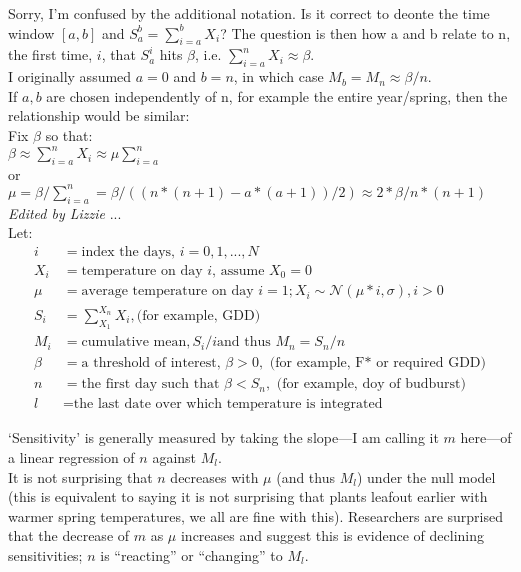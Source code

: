 \documentclass[11pt,letter]{article}
\begin{document}
Sorry, I'm confused by the additional notation. Is it correct to deonte the time window $[a, b]$ and $S_a^b = \sum_{i = a}^b X_i $?
The question is then how a and b relate to n, the first time, $i$, that $S_a^i$ hits $\beta$, i.e. $\sum_{i=a}^n X_i \approx \beta$.\\

I originally assumed $a = 0$ and $b = n$, in which case $M_b = M_n \approx \beta / n.$ \\

If $a, b$ are chosen independently of n, for example the entire year/spring, then the relationship would be similar:\\
Fix $\beta$ so that:\\
$\beta \approx \sum_{i=a}^n X_i \approx \mu \sum_{i=a}^n$\\
or\\
$\mu = \beta / \sum_{i=a}^n  = \beta / (  (n * (n + 1) - a * (a + 1)) / 2 ) \approx 2 * \beta / n * (n +1)$\\

\emph{Edited by Lizzie} ...\\
Let:
\begin{align*}
i & = \text{index the days, }  i = 0, 1, ..., N\\
X_i & = \text{temperature on day $i$, assume } X_0 = 0\\
\mu & = \text{average temperature on day } i = 1; X_i \sim \mathcal{N}(\mu * i, \sigma), i > 0\\
S_i & = \sum_{X_1}^{X_n} X_i,  \text{(for example, GDD)}\\
M_i & = \text{cumulative mean}, S_i / i \text{and thus } M_n=S_n/n \\
\beta & = \text{a threshold of interest, } \beta > 0, \text{ (for example, F* or required GDD)}\\
n &  = \text{the first day such that }  \beta < S_n, \text{ (for example, doy of budburst)}\\
l &  = \text{the last date over which temperature is integrated}
\end{align*}

`Sensitivity' is generally measured by taking the slope---I am calling it $m$ here---of a linear regression of $n$ against $M_l$.\\

It is not surprising that $n$ decreases with $\mu$ (and thus $M_l$) under the null model (this is equivalent to saying it is not surprising that plants leafout earlier with warmer spring temperatures, we all are fine with this). Researchers are surprised that the decrease of $m$ as $\mu$ increases and suggest this is evidence of declining sensitivities; $n$ is ``reacting'' or ``changing'' to $M_l$.\\
\end{document}
